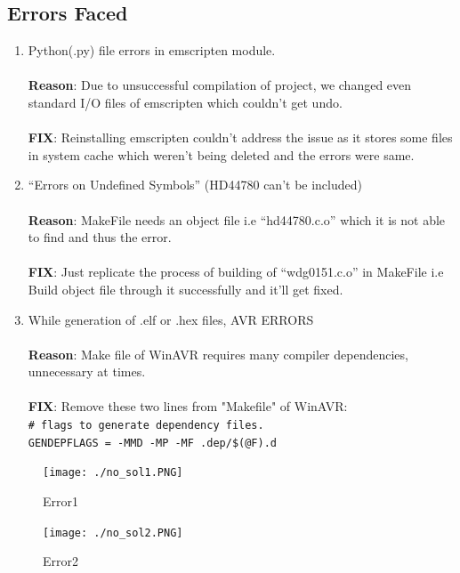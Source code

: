 \documentclass[12pt]{article}
\begin{document}
\subsection{Errors Faced}
\begin{enumerate}
\item Python(.py) file errors in emscripten module.\\ \\
\textbf{Reason}: Due to unsuccessful compilation of project, we changed even standard I/O files of emscripten which couldn’t get undo.\\\\
\textbf{FIX}: Reinstalling emscripten couldn’t address the issue as it stores some files in system cache which weren’t being deleted and the errors were same.

\item “Errors on Undefined Symbols” (HD44780 can’t be included)\\ \\
\textbf{Reason}: MakeFile needs an object file i.e “hd44780.c.o” which it is not able to find and thus the error.\\\\
\textbf{FIX}:  Just replicate the process of building of “wdg0151.c.o” in MakeFile i.e Build object file through it successfully and it’ll get fixed.

\item While generation of .elf or .hex files, AVR ERRORS\\ \\
\textbf{Reason}: Make file of WinAVR requires many compiler dependencies, unnecessary at times.\\\\
\textbf{FIX}:  Remove these two lines from "Makefile" of WinAVR:\\
\texttt{\# flags to generate dependency files.}\\
\texttt{GENDEPFLAGS = -MMD -MP -MF .dep/\$(@F).d}

\end{enumerate}
\begin{figure}[h]
 \centering
 \texttt{[image: ./no\_sol1.PNG]}
 \caption{Error1\label{fig:error faced_1}}
\end{figure}
\pagebreak

\begin{figure}[h]
 \centering
 \texttt{[image: ./no\_sol2.PNG]}
 \caption{Error2\label{fig:error_faced_2}}
\end{figure}
\end{document}

